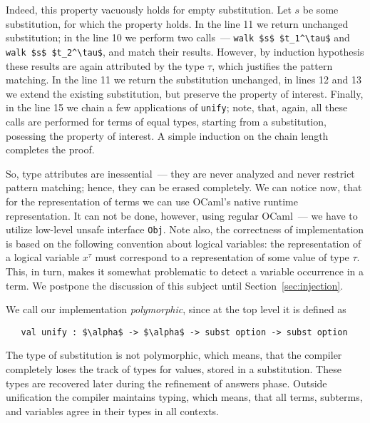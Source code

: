 Indeed, this property vacuously holds for empty substitution. Let $s$ be some substitution, for which the
property holds. In the line 11 we return unchanged substitution; in the line 10 we perform two calls~--- 
\lstinline{walk $s$ $t_1^\tau$} and \lstinline{walk $s$ $t_2^\tau$}, and match their results. However, 
by induction hypothesis these results are again attributed by the type $\tau$, which justifies the
pattern matching. In the line 11 we return the substitution unchanged, in lines 12 and 13 we extend the
existing substitution, but preserve the property of interest. Finally, in the line 15 we chain a few
applications of \lstinline{unify}; note, that, again, all these calls are performed for terms of equal 
types, starting from a substitution, posessing the property of interest. A simple induction on the
chain length completes the proof.

So, type attributes are inessential~--- they are never analyzed and never restrict pattern matching; hence, 
they can be erased completely. We can notice now, that for the representation of terms we can use OCaml's
native runtime representation. It can not be done, however, using regular OCaml~--- we have to utilize
low-level unsafe interface \lstinline{Obj}. Note also, the correctness of implementation is based on
the following convention about logical variables: the representation of a logical variable $x^\tau$ must
correspond to a representation of some value of type $\tau$. This, in turn, makes it somewhat problematic
to detect a variable occurrence in a term. We postpone the discussion of this subject until Section~\ref{sec:injection}.

We call our implementation \emph{polymorphic}, since at the top level it is defined as

\begin{lstlisting}
   val unify : $\alpha$ -> $\alpha$ -> subst option -> subst option
\end{lstlisting} 

The type of substitution is not polymorphic, which means, that the compiler completely loses the track 
of types for values, stored in a substitution. These types are recovered later during the refinement of answers phase.
Outside unification the compiler maintains typing, which means, that all terms, subterms, and variables agree in their types 
in all contexts. 



